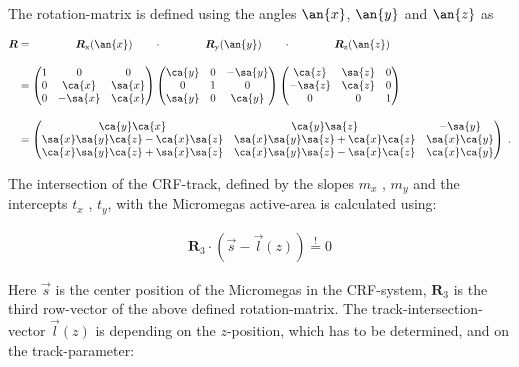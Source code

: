 \documentclass[
twoside,            %
BCOR1.4cm,          %
10pt,               %
headings=normal,    %
headsepline,        %
clearplainpage,		%
final,              %
div=14,
open=right,
bibliography=toc
]{scrreprt}
\begin{document}
The rotation-matrix is defined using the angles $\an{x}$, $\an{y}$ and $\an{z}$ as

\begin{align}
	\boldsymbol{R} &= \qquad\qquad
		\boldsymbol{R}_{\mathrm{x}}(\an{x}) \qquad\cdot\qquad\qquad
		\boldsymbol{R}_{\mathrm{y}}(\an{y}) \qquad\cdot\qquad\qquad
		\boldsymbol{R}_{\mathrm{z}}(\an{z}) 
	\nonumber
	\\[10pt]
	&=
		\begin{pmatrix}
			1 & 0 & 0 \\
			0 & \ca{x} & \sa{x}\\
			0 & -\sa{x} & \ca{x}
		\end{pmatrix}
		\begin{pmatrix}
			\ca{y} & 0 & -\sa{y}\\
			0 & 1 & 0 \\
			\sa{y} & 0 & \ca{y}
		\end{pmatrix}
		\begin{pmatrix}
			\ca{z} & \sa{z} & 0\\
			-\sa{z} & \ca{z} & 0\\
			0 & 0 & 1
		\end{pmatrix}
	\nonumber
	\\[10pt]
	&=
		\begin{pmatrix}
			\ca{y} \ca{x} & 
			\ca{y} \sa{z} & 
			-\sa{y} 
			\\
			\sa{x} \sa{y} \ca{z} - \ca{x} \sa{z} & 
			\sa{x} \sa{y} \sa{z} + \ca{x} \ca{z} & 
			\sa{x} \ca{y} 
			\\
			\ca{x} \sa{y} \ca{z} + \sa{x} \sa{z} & 
			\ca{x} \sa{y} \sa{z} - \sa{x} \ca{z} & 
			\ca{x} \ca{y} 
		\end{pmatrix} \; .
\end{align}

The intersection of the CRF-track, defined by the slopes $m_x$ , $m_y$ and the intercepts $t_x$ , $t_y$, with the Micromegas active-area is calculated using:

\begin{align}
	\boldsymbol{R}_3 \cdot \left( \vec{s} - \vec{l}(z) \right) \stackrel{!}{=} 0
	\label{linePlaneIntersection}
\end{align}

Here $\vec{s}$ is the center position of the Micromegas in the CRF-system, $\boldsymbol{R}_3$ is the third row-vector of the above defined rotation-matrix.
The track-intersection-vector $\vec{l}(z)$ is depending on the $z$-position, which has to be determined, and on the track-parameter:
\end{document}
